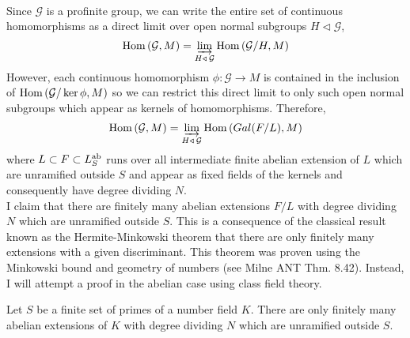 \documentclass[12pt]{extarticle}
\begin{document}
\bigskip\\
Since $\mathcal{G}$ is a profinite group, we can write the entire set of continuous homomorphisms as a direct limit over open normal subgroups $H \triangleleft \mathcal{G}$,
\[ \mathrm{Hom}\left(\mathcal{G}, M\right) = \varinjlim_{H \triangleleft \: \mathcal{G}} \mathrm{Hom}\left( \mathcal{G} / H, M\right) \] 
However, each continuous homomorphism $\phi : \mathcal{G} \to M$ is contained in the inclusion of $\mathrm{Hom}\left(\mathcal{G} / \ker{\phi}, M\right)$ so we can restrict this direct limit to only such open normal subgroups which appear as kernels of homomorphisms. Therefore,
\[ \mathrm{Hom}\left(\mathcal{G}, M\right) = \varinjlim_{H \triangleleft \: \mathcal{G}} \mathrm{Hom}\left( Gal \small(F / L \small) , M\right) \]
where $L \subset F \subset L^{\mathrm{ab}}_{S}$ runs over all intermediate finite abelian extension of $L$ which are unramified outside $S$ and appear as fixed fields of the kernels and consequently have degree dividing $N$.
\bigskip\\
I claim that there are finitely many abelian extensions $F/L$ with degree dividing $N$ which are unramified outside $S$. This is a consequence of the classical result known as the Hermite-Minkowski theorem that there are only finitely many extensions with a given discriminant. This theorem was proven using the Minkowski bound and geometry of numbers (see Milne ANT Thm. 8.42). Instead, I will attempt a proof in the abelian case using class field theory.

\begin{theorem}
Let $S$ be a finite set of primes of a number field $K$. There are only finitely many abelian extensions of $K$ with degree dividing $N$ which are unramified outside $S$.
\end{theorem} 
\end{document}
